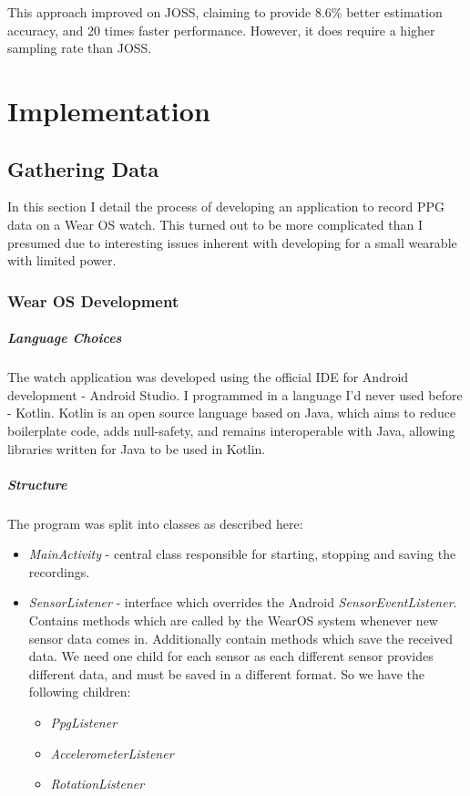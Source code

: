 \documentclass[12pt,a4paper,twoside,openright]{report}
\begin{document}
This approach improved on JOSS, claiming to provide 8.6\% better estimation
accuracy, and 20 times faster performance. However, it does require a higher
sampling rate than JOSS.


\chapter{Implementation}

\section{Gathering Data}

In this section I detail the process of developing an
application to record PPG data on a Wear OS watch. This turned out to be more
complicated than I presumed due to interesting issues inherent with developing for a small
wearable with limited power.

\subsection{Wear OS Development}

\paragraph{Language Choices}

The watch application was developed using the official IDE for Android
development - Android Studio. I programmed in a language I'd never used before
- Kotlin. Kotlin is an open source language based on Java, which aims to
reduce boilerplate code, adds null-safety, and remains interoperable with
Java, allowing libraries written for Java to be used in Kotlin.

\paragraph{Structure}

The program was split into classes as described here:

\begin{itemize}
	\item \emph{MainActivity} - central class responsible for starting,
		stopping and saving the recordings.

	\item \emph{SensorListener} - interface which overrides the Android
		\emph{SensorEventListener}. Contains methods which
		are called by the WearOS system whenever new sensor data comes
		in. Additionally contain methods which save the received data.
		We need one child for each sensor as each different sensor
		provides different data, and must be saved in a different
		format. So we have the following children:

	\begin{itemize}
		\item \emph{PpgListener}
		\item \emph{AccelerometerListener}
		\item \emph{RotationListener}
	\end{itemize}

\end{itemize}
\end{document}
